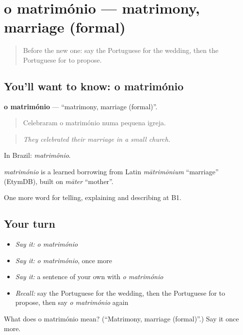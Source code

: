 \section[o matrimónio]{o matrimónio — matrimony, marriage (formal)}

\label{lesson:PT-C312-matrimonio}



\begin{quote}
Before the new one: say the Portuguese for the wedding, then the Portuguese for to propose.
\end{quote}

\subsection*{You'll want to know: o matrimónio}
\textbf{o matrimónio} — \textquotedblleft{}matrimony, marriage (formal)\textquotedblright{}.

\begin{quote}
Celebraram o matrimónio numa pequena igreja.
\end{quote}

\begin{quote}
\emph{They celebrated their marriage in a small church.}
\end{quote}

In Brazil: \emph{matrimônio}.

\begin{cousinweb}
\emph{matrimónio} is a learned borrowing from Latin \emph{mātrimōnium} \textquotedblleft{}marriage\textquotedblright{} (EtymDB), built on \emph{māter} \textquotedblleft{}mother\textquotedblright{}.
\end{cousinweb}

\begin{grammarlens}[title={What you've built}]
One more word for telling, explaining and describing at B1.
\end{grammarlens}

\subsection*{Your turn}
\begin{itemize}
\raggedright
  \item \emph{Say it:} \emph{o matrimónio}
  \item \emph{Say it:} \emph{o matrimónio}, once more
  \item \emph{Say it:} a sentence of your own with \emph{o matrimónio}
  \item \emph{Recall:} say the Portuguese for the wedding, then the Portuguese for to propose, then say \emph{o matrimónio} again
\end{itemize}

\begin{tcolorbox}[breakable,colback=teal!4,colframe=teal!35!black,title={Before you move on}]
What does o matrimónio mean? (\textquotedblleft{}Matrimony, marriage (formal)\textquotedblright{}.) Say it once more.
\end{tcolorbox}
